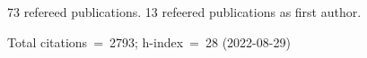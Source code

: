 73 refereed publications. 13 refeered publications as first author.

Total citations~=~2793; h-index~=~28 (2022-08-29)